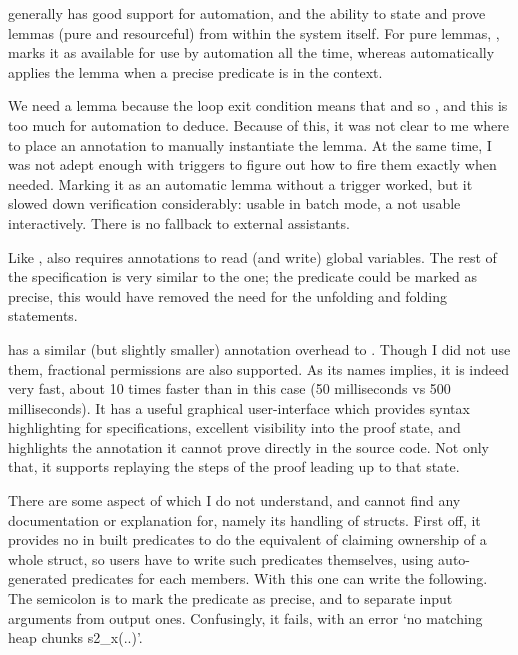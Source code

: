
 generally has good support for automation, and the ability to
state and prove lemmas (pure and resourceful) from within the system itself.
For pure lemmas, , marks it as available for use by
automation all the time, whereas  automatically
applies the lemma when a precise predicate  is in the context.

We need a lemma because the loop exit condition  means that
 and so , %
and this is too much for automation to deduce. Because of this, it was not clear
to me where to place an annotation to manually instantiate the lemma. At the
same time, I was not adept enough with triggers to figure out how to fire them
exactly when needed. Marking it as an automatic lemma without a trigger worked,
but it slowed down verification considerably: usable in batch mode, a not usable
interactively. There is no fallback to external assistants.


Like ,  also requires annotations to read (and write)
global variables. The rest of the specification is very similar to the 
one; the  predicate could be marked as precise, this would
have removed the need for the unfolding and folding statements.


 has a similar (but slightly smaller) annotation overhead to
\@. Though I did not use them, fractional permissions are also
supported. As its names implies, it is indeed very fast, about 10 times faster
than  in this case (50 milliseconds vs 500 milliseconds). It has a
useful graphical user-interface which provides syntax highlighting for
specifications, excellent visibility into the proof state, and highlights the
annotation it cannot prove directly in the source code. Not only that, it
supports replaying the steps of the proof leading up to that state.

There are some aspect of  which I do not understand, and cannot
find any documentation or explanation for, namely its handling of structs.
First off, it provides no in built predicates to do the equivalent of claiming
ownership of a whole struct, so users have to write such predicates themselves,
using auto-generated predicates for each members. With this one can write the
following. The semicolon is to mark the predicate as precise, and to separate
input arguments from output ones. Confusingly, it fails, with an error `no
matching heap chunks s2\_x(..)'. %

